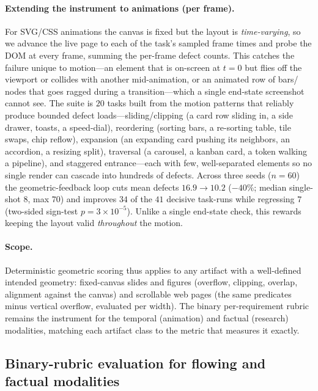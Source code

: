 \paragraph{Extending the instrument to animations (per frame).}
\label{sec:anim-geometry}
For SVG/CSS animations the canvas is fixed but the layout is \emph{time-varying},
so we advance the live page to each of the task's sampled frame times and probe
the DOM at every frame, summing the per-frame defect counts. This catches the
failure unique to motion---an element that is on-screen at $t{=}0$ but flies off
the viewport or collides with another mid-animation, or an animated row of bars/
nodes that goes ragged during a transition---which a single end-state screenshot
cannot see. The suite is $20$ tasks built from the motion patterns that reliably
produce bounded defect loads---sliding/clipping (a card row sliding in, a side
drawer, toasts, a speed-dial), reordering (sorting bars, a re-sorting table, tile
swaps, chip reflow), expansion (an expanding card pushing its neighbors, an
accordion, a resizing split), traversal (a carousel, a kanban card, a token
walking a pipeline), and staggered entrance---each with few, well-separated
elements so no single render can cascade into hundreds of defects. Across three
seeds ($n{=}60$) the geometric-feedback loop cuts mean defects $16.9\to10.2$
($-40\%$; median single-shot $8$, max $70$) and improves $34$ of the $41$ decisive
task-runs while regressing $7$ (two-sided sign-test $p=3\times10^{-5}$). Unlike a
single end-state check, this rewards keeping the layout valid \emph{throughout}
the motion.

\paragraph{Scope.} Deterministic geometric scoring thus applies to any artifact
with a well-defined intended geometry: fixed-canvas slides and figures (overflow,
clipping, overlap, alignment against the canvas) and scrollable web pages (the
same predicates minus vertical overflow, evaluated per width). The binary
per-requirement rubric remains the instrument for the temporal (animation) and
factual (research) modalities, matching each artifact class to the metric that
measures it exactly.

\subsection{Binary-rubric evaluation for flowing and factual modalities}
\label{sec:rubric}

